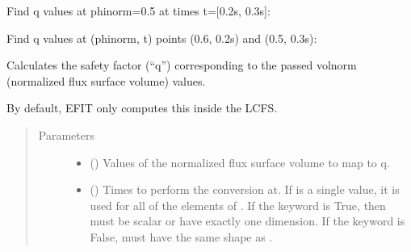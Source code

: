 \documentclass[letterpaper,10pt,english]{sphinxmanual}
\begin{document}
\begin{fulllineitems}
\begin{fulllineitems}
Find q values at phinorm=0.5 at times t={[}0.2s, 0.3s{]}:

\begin{sphinxVerbatim}[commandchars=\\\{\}]
   \PYG{p}{[} \PYG{p}{]}
\end{sphinxVerbatim}

Find q values at (phinorm, t) points (0.6, 0.2s) and (0.5, 0.3s):

\begin{sphinxVerbatim}[commandchars=\\\{\}]
  \PYG{p}{[} \PYG{p}{]} \PYG{p}{[} \PYG{p}{]} 
\end{sphinxVerbatim}

\end{fulllineitems}


\begin{fulllineitems}
\label{\detokenize{eqtools:eqtools.core.Equilibrium.volnorm2q}}
Calculates the safety factor (“q”) corresponding to the passed volnorm (normalized flux surface volume) values.

By default, EFIT only computes this inside the LCFS.
\begin{quote}\begin{description}
\item[{Parameters}] \leavevmode\begin{itemize}
\item {} 
 () \textendash{} Values of the normalized
flux surface volume to map to q.

\item {} 
 () \textendash{} Times to perform the conversion at.
If  is a single value, it is used for all of the elements of
. If the  keyword is True, then  must be scalar
or have exactly one dimension. If the  keyword is False,
 must have the same shape as .


\end{itemize}
\end{description}
\end{quote}
\end{fulllineitems}
\end{fulllineitems}
\end{document}
